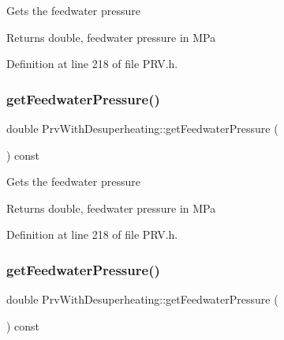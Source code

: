 Gets the feedwater pressure

\begin{DoxyReturn}{Returns}
double, feedwater pressure in M\+Pa 
\end{DoxyReturn}


Definition at line 218 of file P\+R\+V.\+h.

\mbox{\label{class_prv_with_desuperheating_a260bbe19272694af509fb408a821b041}} 
\subsubsection{\texorpdfstring{get\+Feedwater\+Pressure()}{getFeedwaterPressure()}\hspace{0.1cm}{\footnotesize\ttfamily [2/3]}}
{\footnotesize\ttfamily double Prv\+With\+Desuperheating\+::get\+Feedwater\+Pressure (\begin{DoxyParamCaption}{ }\end{DoxyParamCaption}) const\hspace{0.3cm}{\ttfamily [inline]}}

Gets the feedwater pressure

\begin{DoxyReturn}{Returns}
double, feedwater pressure in M\+Pa 
\end{DoxyReturn}


Definition at line 218 of file P\+R\+V.\+h.

\mbox{\label{class_prv_with_desuperheating_a260bbe19272694af509fb408a821b041}} 
\subsubsection{\texorpdfstring{get\+Feedwater\+Pressure()}{getFeedwaterPressure()}\hspace{0.1cm}{\footnotesize\ttfamily [3/3]}}
{\footnotesize\ttfamily double Prv\+With\+Desuperheating\+::get\+Feedwater\+Pressure (\begin{DoxyParamCaption}{ }\end{DoxyParamCaption}) const\hspace{0.3cm}{\ttfamily [inline]}}

